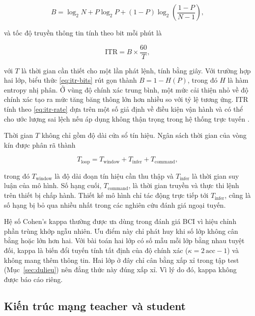 \begin{equation}
\label{eq:itr-bits}
B = \log_2 N + P\log_2 P + (1-P)\log_2\!\left(\frac{1-P}{N-1}\right),
\end{equation}

và tốc độ truyền thông tin tính theo bit mỗi phút là

\begin{equation}
\label{eq:itr-rate}
\mathrm{ITR} = B \times \frac{60}{T},
\end{equation}

với $T$ là thời gian cần thiết cho một lần phát lệnh, tính bằng giây. Với
trường hợp hai lớp, biểu thức \eqref{eq:itr-bits} rút gọn thành
$B = 1 - H(P)$, trong đó $H$ là hàm entropy nhị phân. Ở vùng độ chính xác
trung bình, một mức cải thiện nhỏ về độ chính xác tạo ra mức tăng băng
thông lớn hơn nhiều so với tỷ lệ tương ứng. ITR tính theo
\eqref{eq:itr-rate} dựa trên một số giả định về điều kiện vận hành và có
thể cho ước lượng sai lệch nếu áp dụng không thận trọng trong hệ thống
trực tuyến \cite{yuan2013study}.

Thời gian $T$ không chỉ gồm độ dài cửa sổ tín hiệu. Ngân sách thời gian
của vòng kín được phân rã thành

\begin{equation}
\label{eq:latency}
T_{\mathrm{loop}} = T_{\mathrm{window}} + T_{\mathrm{infer}}
                  + T_{\mathrm{command}},
\end{equation}

trong đó $T_{\mathrm{window}}$ là độ dài đoạn tín hiệu cần thu thập và $T_{\mathrm{infer}}$ là thời gian
suy luận của mô hình. Số hạng cuối, $T_{\mathrm{command}}$, là thời gian
truyền và thực thi lệnh trên thiết bị chấp hành. Thiết kế mô hình chỉ tác
động trực tiếp tới $T_{\mathrm{infer}}$, cũng là số hạng bị bỏ qua nhiều
nhất trong các nghiên cứu đánh giá ngoại tuyến.

Hệ số Cohen's kappa thường được ưa dùng trong đánh giá BCI vì hiệu chỉnh
phần trùng khớp ngẫu nhiên. Ưu điểm này chỉ phát huy khi số lớp không cân
bằng hoặc lớn hơn hai. Với bài toán hai lớp có số mẫu mỗi lớp bằng nhau
tuyệt đối, kappa là biến đổi tuyến tính tất định của độ chính xác
($\kappa = 2\,\mathrm{acc} - 1$) và không mang thêm thông tin. Hai lớp ở
đây chỉ cân bằng xấp xỉ trong tập test (Mục~\ref{sec:dulieu}) nên đẳng
thức này đúng xấp xỉ. Vì lý do đó, kappa không được báo cáo riêng.

\subsection{Kiến trúc mạng teacher và student}
\label{sec:kientruc}

